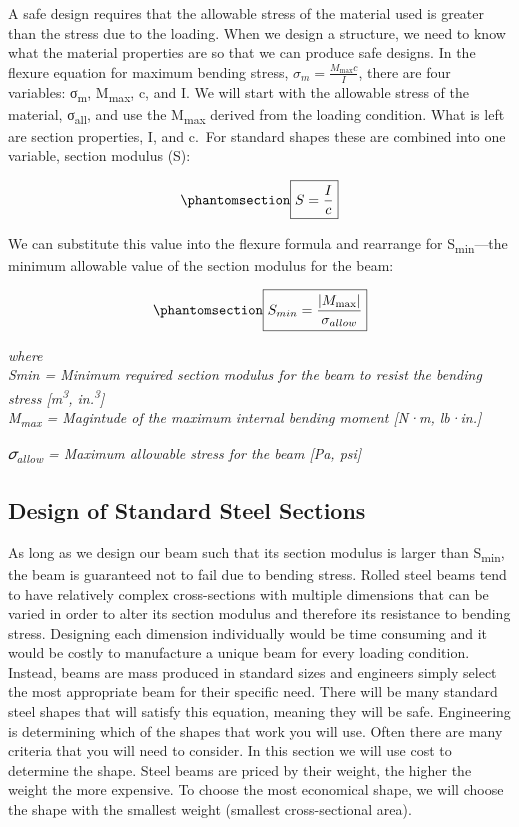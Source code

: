 \documentclass[
  letterpaper,
  DIV=11,
  numbers=noendperiod]{scrreprt}
\theoremstyle{definition}
\theoremstyle{remark}
\begin{document}
A safe design requires that the allowable stress of the material used is
greater than the stress due to the loading. When we design a structure,
we need to know what the material properties are so that we can produce
safe designs. In the flexure equation for maximum bending stress,
\(\sigma_m=\frac{M_{\max } c}{I}\), there are four variables:
σ\textsubscript{m}, M\textsubscript{max}, c, and I. We will start with
the allowable stress of the material, σ\textsubscript{all}, and use the
\textbar M\textsubscript{max}\textbar{} derived from the loading
condition. What is left are section properties, I, and c.~For standard
shapes these are combined into one variable, section modulus (S):

\begin{equation}\phantomsection\label{eq-9.3}{
\boxed{S=\frac{I}{c}}
}\end{equation}

We can substitute this value into the flexure formula and rearrange for
S\textsubscript{min}---the minimum allowable value of the section
modulus for the beam:

\begin{equation}\phantomsection\label{eq-9.4}{
\boxed{S_{min}=\frac{\left|M_{\max}\right|}{\sigma_{allow}}}
}\end{equation}

\emph{where}\\
\emph{Smin = Minimum required section modulus for the beam to resist the
bending stress {[}m\textsuperscript{3}, in.\textsuperscript{3}{]}}\\
\emph{\textbar M\textsubscript{max}\textbar{} = Magintude of the maximum
internal bending moment {[}N·m, lb·in.{]}}

\emph{𝜎\textsubscript{allow} = Maximum allowable stress for the beam
{[}Pa, psi{]}}

\subsection{Design of Standard Steel
Sections}\label{design-of-standard-steel-sections}

As long as we design our beam such that its section modulus is larger
than S\textsubscript{min}, the beam is guaranteed not to fail due to
bending stress. Rolled steel beams tend to have relatively complex
cross-sections with multiple dimensions that can be varied in order to
alter its section modulus and therefore its resistance to bending
stress. Designing each dimension individually would be time consuming
and it would be costly to manufacture a unique beam for every loading
condition. Instead, beams are mass produced in standard sizes and
engineers simply select the most appropriate beam for their specific
need. There will be many standard steel shapes that will satisfy this
equation, meaning they will be safe. Engineering is determining which of
the shapes that work you will use. Often there are many criteria that
you will need to consider. In this section we will use cost to determine
the shape. Steel beams are priced by their weight, the higher the weight
the more expensive. To choose the most economical shape, we will choose
the shape with the smallest weight (smallest cross-sectional area).
\end{document}
